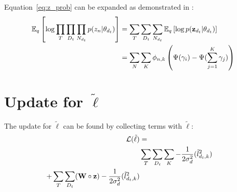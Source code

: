 \documentclass{article}
\newcommand{\z}{\bold{z}}
\newcommand{\W}{\textbf{W}}
\newcommand{\lv}{\tilde{l}}
\newcommand{\vd}{\sigma^2_{d}}
\newcommand{\ellv}{\tilde{\ell}}
\newcommand{\expectq}[1]{\mathbb{E}_q\left[#1\right]}
\begin{document}
Equation~\ref{eq:z_prob} can be expanded as demonstrated in
\cite{blei:2003}:
\begin{align}
  \expectq{ \log \prod_T \prod_{D_t} \prod_{N_{d_t}} p(z_n | \theta_{d_t}) }
  & = \sum_T \sum_{D_t} \sum_{N_{d_t}} \expectq{ \log p( \z_{d_t} | \theta_{d_t} ) }  \\
  & = \sum_N \sum_K \phi_{n,k} \left( \Psi(\gamma_i) - \Psi(\sum_{j=1}^K \gamma_j ) \right) \\
\end{align}

\section{Update for $\ellv$}
The update for $\ellv$ can be found by collecting terms with $\ellv$:
\begin{align}
\mathcal{L}(\ellv) & = &  \\
  & \sum_T \sum_{D_t} \sum_K -\frac{1}{2 \vd} (\lv_{d_t,k}^2) \\
  + \sum_T \sum_{D_t} (\W \circ \z) -\frac{1}{2 \vd} (\lv_{d_t,k}^2) \\
\end{align}
\end{document}
